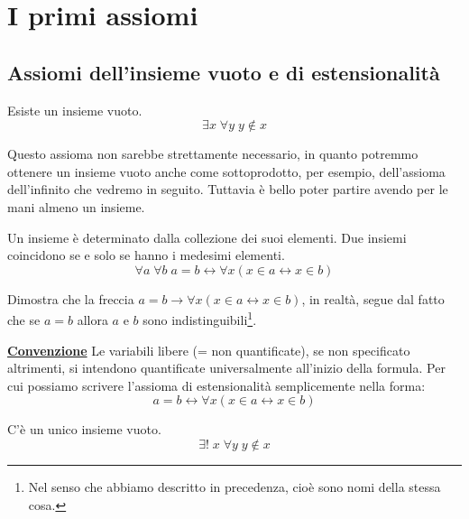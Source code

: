 \documentclass[11pt]{scrartcl}
\begin{document}
\newpage
\section{I primi assiomi}
\subsection{Assiomi dell'insieme vuoto e di estensionalità}
\begin{axiom}
\label{ax1}
Esiste un insieme vuoto.
\[ \exists x \; \forall y \; y \not\in x
		\]
\end{axiom}

\begin{note}
Questo assioma non sarebbe strettamente necessario, in quanto potremmo ottenere un insieme vuoto anche come sottoprodotto, per esempio, dell'assioma dell'infinito che vedremo in seguito.
Tuttavia è bello poter partire avendo per le mani almeno un insieme.
\end{note}

\begin{axiom}
\label{ax2}
Un insieme è determinato dalla collezione dei suoi elementi. Due insiemi coincidono se e solo se hanno i medesimi elementi.
\[ \forall a \; \forall b \; a = b \leftrightarrow \forall x (x \in a \leftrightarrow x \in b)
	\]
\end{axiom}

\begin{exercise}
Dimostra che la freccia $a = b \rightarrow \forall x (x \in a \leftrightarrow x \in b)$, in realtà, segue dal fatto che se $a = b$ allora $a$ e $b$ sono indistinguibili\footnote{Nel senso che abbiamo descritto in precedenza, cioè sono nomi della stessa cosa.}.
\end{exercise}

\textbf{\underline{Convenzione}} Le variabili libere (= non quantificate), se non specificato altrimenti, si intendono quantificate universalmente all'inizio della formula. Per cui possiamo scrivere
l'assioma di estensionalità semplicemente nella forma:
\[ a = b \leftrightarrow \forall x (x \in a \leftrightarrow x \in b)
	\]

\begin{proposition}
C'è un unico insieme vuoto.
\[ \exists ! \; x \; \forall y \; y \not \in x
	\]
\end{proposition}
\end{document}
